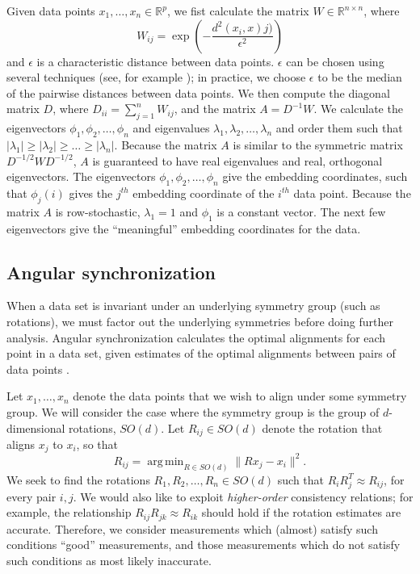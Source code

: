 \documentclass[10pt]{article}
\DeclareMathOperator*{\argmin}{arg\,min}
\begin{document}
Given data points $x_1, \dots, x_n \in \mathbb{R}^p$, we fist calculate the matrix $W \in \mathbb{R}^{n \times n}$, where 
\begin{equation}
W_{ij} = \exp \left( -\frac{d^2(x_i, x)j)}{\epsilon^2} \right)
\end{equation}
and $\epsilon$ is a characteristic distance between data points.
%
$\epsilon$ can be chosen using several techniques (see, for example \cite{coifman2008graph}); in practice, we choose $\epsilon$ to be the median of the pairwise distances between data points.
%
We then compute the diagonal matrix $D$, where $D_{ii} = \sum_{j=1}^{n} W_{ij}$, and the matrix $A = D^{-1} W$. 
%
We calculate the eigenvectors $\phi_1, \phi_2, \dots, \phi_n$ and eigenvalues $\lambda_1, \lambda_2, \dots, \lambda_n$ and order them such that $|\lambda_1| \ge |\lambda_2| \ge \dots \ge |\lambda_n|$. 
%
Because the matrix $A$ is similar to the symmetric matrix $D^{-1/2} W D^{-1/2}$, $A$ is guaranteed to have real eigenvalues and real, orthogonal eigenvectors. 
%
The eigenvectors $\phi_1, \phi_2, \dots, \phi_n$ give the embedding coordinates, such that $\phi_j(i)$ gives the $j^{th}$ embedding coordinate of the $i^{th}$ data point. 
%
Because the matrix $A$ is row-stochastic, $\lambda_1=1$ and $\phi_1$ is a constant vector.
%
The next few eigenvectors give the ``meaningful'' embedding coordinates for the data. 

\subsection*{Angular synchronization}

When a data set is invariant under an underlying symmetry group (such as rotations), we must factor out the underlying symmetries before doing further analysis.
%
Angular synchronization calculates the optimal alignments for each point in a data set, given estimates of the optimal alignments between pairs of data points \cite{singer2011angular}. 

Let $x_1, \dots, x_n$ denote the data points that we wish to align under some symmetry group.
%
We will consider the case where the symmetry group is the group of $d$-dimensional rotations, $SO(d)$. 
%
Let $R_{ij} \in SO(d)$ denote the rotation that aligns $x_j$ to $x_i$, so that
\begin{equation}
R_{ij} = \argmin_{R \in SO(d)} \|Rx_j - x_i \|^2.
\end{equation}
%
We seek to find the rotations $R_1, R_2, \dots, R_n \in SO(d)$ such that $R_i R_j^T \approx R_{ij}$, for every pair $i, j$. 
%
We would also like to exploit {\em higher-order} consistency relations;
for example, the relationship $R_{ij} R_{jk} \approx R_{ik}$ should hold if the rotation estimates are accurate.
%
Therefore, we consider measurements which (almost) satisfy such conditions ``good'' measurements, and those measurements which do not satisfy such conditions as most likely inaccurate.
\end{document}
